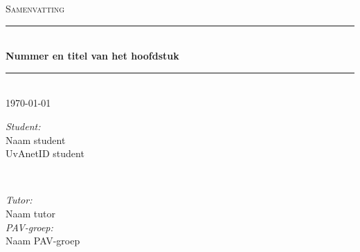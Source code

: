 \documentclass[a4paper,12pt]{article}
\newcommand{\opdracht}{Samenvatting}			%
\newcommand{\titel}{Nummer en titel van het hoofdstuk}	%
\newcommand{\studentA}{Naam student}			%
\newcommand{\uvanetidA}{UvAnetID student}
\newcommand{\tutor}{Naam tutor}				%
\newcommand{\PAVgroep}{Naam  PAV-groep}		%
\newcommand{\datum}{\today}					%
\begin{document}
\thispagestyle{firststyle}
\begin{center}
	\textsc{\Large \opdracht}\\[0.2cm]
		\rule{\linewidth}{0.5pt} \\[0.4cm]
			{ \huge \bfseries \titel}
		\rule{\linewidth}{0.5pt} \\[0.2cm]
	{\large \datum  \\[0.4cm]}

	\begin{minipage}{0.4\textwidth}
		\begin{flushleft}
			\emph{Student:}\\
			{\studentA \\ {\small \uvanetidA \\[0.2cm]}}
		\end{flushleft}
	\end{minipage}
~
	\begin{minipage}{0.4\textwidth}
		\begin{flushright}
			\emph{Tutor:} \\
			\tutor \\[0.2cm]
			\emph{PAV-groep:} \\
			\PAVgroep \\[0.2cm]
		\end{flushright}
	\end{minipage}\\[1 cm]
\end{center}



\end{document}
